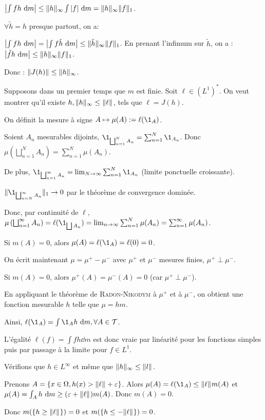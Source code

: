 \documentclass[10pt,a4paper,notitlepage ]{report}
\begin{document}
\begin{demo}
	$\left|\int fh\dd m \right|\le \norm[\infty] h \int |f|\dd m = \norm[\infty] h \norm[1]f$.
	
	$\forall \tilde h = h$ presque partout, on a:
	
	$\left|\int fh\dd m\right| = \left|\int f \tilde h \dd m\right| \le \norm[\infty]{\tilde h} \norm[1] f$. En prenant l'infimum sur $\tilde h$, on a : $\left|\tilde fh\dd m \right| \le \norm[\infty] h \norm[1]f$.
	
	Donc : $\norm{J(h)} \le \norm[\infty]h$.
	
	Supposons dans un premier temps que $m$ est finie. Soit $\ell\in(L^1)^*$. On veut montrer qu'il existe $h,\norm[\infty]h \le \norm \ell$, tels que $\ell = J(h)$.
	
	On définit la mesure à signe $A\mapsto \mu(A) := \ell(\1_A)$.
	
	Soient $A_n$ mesurables dijoints, $\1_{\bigsqcup_{n=1}^N A_n} = \sum_{n=1}^N \1_{A_n}$. Donc $\mu\left(\bigsqcup_{n=1}^N A_n\right) = \sum_{n=1}^N \mu(A_n)$.
	
	De plus, $\1_{\bigsqcup_{n=1}^\infty A_n} = \lim_{N\rightarrow \infty} \sum_{n=1}^N \1_{A_n}$ (limite ponctuelle croissante).
	
	$\norm[1]{\1_{\bigsqcup_{n=N}^\infty A_n}} \rightarrow 0$ par le théorème de convergence dominée.
	
	Donc, par continuité de $\ell$, $\mu\left(\bigsqcup_{n=1}^\infty A_n\right) = \ell(\1_{\bigsqcup A_n}) = \lim_{n\rightarrow \infty} \sum_{n=1}^N \mu(A_n) = \sum_{n=1}^\infty \mu(A_n)$.
	
	Si $m(A) = 0$, alors $\mu(A)=\ell(\1_A)=\ell(0) = 0$.
	
	On écrit maintenant $\mu=\mu^+-\mu^-$ avec $\mu^+$ et $\mu^-$ mesures finies, $\mu^+ \perp \mu^-$.
	
	Si $m(A)=0$, alors $\mu^+(A) = \mu^-(A)=0$ (car $\mu^+ \perp \mu^-$).
	
	En appliquant le théorème de \textsc{Radon-Nikodym} à $\mu^+$ et à $\mu^-$, on obtient une fonction mesurable $h$ telle que $\mu=hm$.
	
	Ainsi, $\ell(\1_A) = \int \1_A h\dd m, \forall A\in\T$.
	
	L'égalité $\ell(f)=\int fh\dd m$ est donc vraie par linéarité pour les fonctions simples puis par passage à la limite pour $f\in L^1$.
	
	Vérifions que $h\in L^\infty$ et même que $\norm[\infty] h \le \norm l$.
	
	Prenons $A=\set{x\in\Omega, h(x)>\norm\ell+\eps}$. Alors $\mu(A)=\ell(\1_A)\le\norm\ell m(A)$ et $\mu(A) = \int_A h\dd m \ge (\eps + \norm\ell)m(A)$. Donc $m(A) = 0$.
	
	Donc $m(\set{h\ge\norm\ell}) = 0$ et $m(\set{h\le-\norm\ell}) = 0$.

\end{demo}
\end{document}
